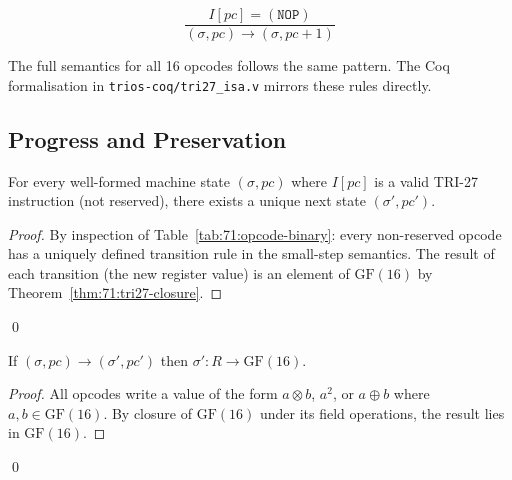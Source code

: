 \[
  \frac{I[\mathit{pc}] = (\texttt{NOP})}
       {(\sigma, \mathit{pc}) \to (\sigma, \mathit{pc}+1)}
\]

The full semantics for all 16 opcodes follows the same pattern.
The Coq formalisation in \texttt{trios-coq/tri27\_isa.v} mirrors
these rules directly.

\subsection{Progress and Preservation}
\label{subsec:71:progress-preservation}

\begin{proposition}[Progress]
\label{prop:71:progress}
For every well-formed machine state $(\sigma, \mathit{pc})$ where
$I[\mathit{pc}]$ is a valid TRI-27 instruction (not reserved),
there exists a unique next state $(\sigma', \mathit{pc}')$.
\end{proposition}

\begin{proof}
By inspection of Table~\ref{tab:71:opcode-binary}: every non-reserved
opcode has a uniquely defined transition rule in the small-step
semantics.  The result of each transition (the new register value)
is an element of $\mathrm{GF}(16)$ by Theorem~\ref{thm:71:tri27-closure}.
\end{proof}
\qed

\begin{proposition}[Preservation]
\label{prop:71:preservation}
If $(\sigma, \mathit{pc}) \to (\sigma', \mathit{pc}')$ then
$\sigma' : R \to \mathrm{GF}(16)$.
\end{proposition}

\begin{proof}
All opcodes write a value of the form $a \otimes b$, $a^2$, or
$a \oplus b$ where $a, b \in \mathrm{GF}(16)$.  By closure of
$\mathrm{GF}(16)$ under its field operations, the result lies in
$\mathrm{GF}(16)$.
\end{proof}
\qed
